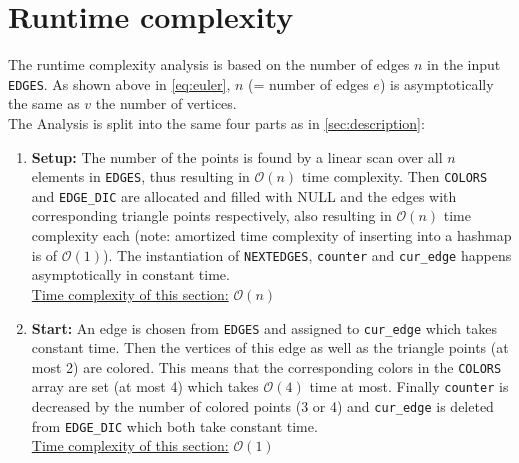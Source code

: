 \documentclass[english]{scrartcl}
\newcommand{\code}{\texttt}
\begin{document}
\section{Runtime complexity}
\label{sec:runtime_comp}
The runtime complexity analysis is based on the number of edges $n$ in the input \code{EDGES}. As shown above in \autoref{eq:euler}, $n$ (= number of edges $e$) is asymptotically the same as $v$ the number of vertices.\\
The Analysis is split into the same four parts as in \autoref{sec:description}:
\begin{enumerate}
    \item \textbf{Setup:} The number of the points is found by a linear scan over all $n$ elements in \code{EDGES}, thus resulting in $\mathcal{O}(n)$ time complexity. Then \code{COLORS} and \code{EDGE\_DIC} are allocated and filled with NULL and the edges with corresponding triangle points respectively, also resulting in $\mathcal{O}(n)$ time complexity each (note: amortized time complexity of inserting into a hashmap is of $\mathcal{O}(1)$). The instantiation of \code{NEXTEDGES}, \code{counter} and \code{cur\_edge} happens asymptotically in constant time. \\ \underline{Time complexity of this section:} $\mathcal{O}(n)$
    \item \textbf{Start:} An edge is chosen from \code{EDGES} and assigned to \code{cur\_edge} which takes constant time. Then the vertices of this edge as well as the triangle points (at most 2) are colored. This means that the corresponding colors in the \code{COLORS} array are set (at most 4) which takes $\mathcal{O}(4)$ time at most. Finally \code{counter} is decreased by the number of colored points (3 or 4) and \code{cur\_edge} is deleted from \code{EDGE\_DIC} which both take constant time.  \\ \underline{Time complexity of this section:} $\mathcal{O}(1)$

\end{enumerate}
\end{document}
